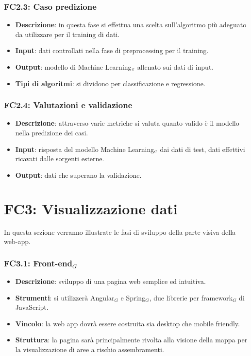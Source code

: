 \subsubsection{FC2.3: Caso predizione}\label{fasiProgettoElaborazioneDatiCasoPredizione}

\begin{itemize}
	\item \textbf{Descrizione}: in questa fase si effettua una scelta sull'algoritmo più adeguato da utilizzare per il training di dati.
	\item \textbf{Input}: dati controllati nella fase di preprocessing per il training.
	\item \textbf{Output}: modello di Machine Learning$_{\scaleto{G}{3pt}}$ allenato sui dati di input.
	\item \textbf{Tipi di algoritmi}: si dividono per classificazione e regressione.%
\end{itemize}

\subsubsection{FC2.4: Valutazioni e validazione}\label{fasiProgettoElaborazioneDatiValutazioniValidazione}

\begin{itemize}
	\item \textbf{Descrizione}: attraverso varie metriche si valuta quanto valido è il modello nella predizione dei casi.
	\item \textbf{Input}: risposta del modello Machine Learning$_{\scaleto{G}{3pt}}$ dai dati di test, dati effettivi ricavati dalle sorgenti esterne.
	\item \textbf{Output}: dati che superano la validazione.
\end{itemize}

\section{FC3: Visualizzazione dati}\label{fasiProgettoVisualizzazioneDati}
In questa sezione verranno illustrate le fasi di sviluppo della parte visiva della web-app.

\subsubsection{FC3.1: Front-end$_G$}\label{fasiProgettoVisualizzazioneDatiFrontEnd}

\begin{itemize}
	\item \textbf{Descrizione}: sviluppo di una pagina web semplice ed intuitiva.
	\item \textbf{Strumenti}: si utilizzerà Angular$_G$ e Spring$_G$, due librerie per framework$_G$ di JavaScript.
	\item \textbf{Vincolo}: la web app dovrà essere costruita sia desktop che mobile friendly. 
	\item \textbf{Struttura}: la pagina sarà principalmente rivolta alla visione della mappa per la visualizzazione di aree a rischio assembramenti.
\end{itemize}

